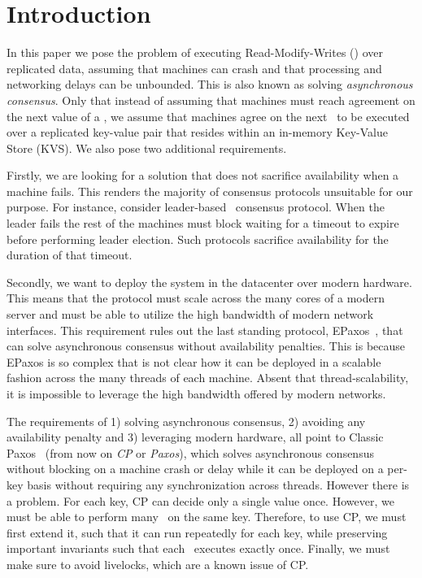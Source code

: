 \section{Introduction}

In this paper we pose the problem of executing Read-Modify-Writes (\RMWs) over replicated data, assuming that machines can crash and that processing and networking delays can be unbounded.
This is also known as solving \emph{asynchronous consensus}.
Only that instead of assuming that machines must reach agreement on the next value of a , we assume that machines agree on the next \RMW\ to be executed over a replicated key-value pair that resides within an in-memory Key-Value Store (KVS).
We also pose two additional requirements.

Firstly, we are looking for a solution that does not sacrifice availability when a machine fails. This renders the majority of consensus protocols unsuitable for our purpose. For instance, consider leader-based~\cite{Lamport:2001, Ongaro:2014, Reed:2008} consensus protocol. When the leader fails the rest of the machines must block waiting for a timeout to expire before performing leader election. Such protocols sacrifice availability for the duration of that timeout.

Secondly, we want to deploy the system in the datacenter over modern hardware. This means that the protocol must scale across the many cores of a modern server and must be able to utilize the high bandwidth of modern network interfaces. This requirement rules out the last standing protocol, EPaxos~\cite{Moraru:2013}, that can solve asynchronous consensus without availability penalties. This is because EPaxos is so complex that is not clear how it can be deployed in a scalable fashion across the many threads of each machine. Absent that thread-scalability, it is impossible to leverage the high bandwidth offered by modern networks.


\custvspace
The requirements of 1) solving asynchronous consensus, 2) avoiding any availability penalty and 3) leveraging modern hardware,  all point to 
Classic Paxos~\cite{Lamport:1998} (from now on \emph{CP} or \emph{Paxos}), which solves asynchronous consensus without blocking on a machine crash or delay while it can be deployed on a per-key basis without requiring any synchronization across threads. However there is a problem.
For each key, CP can decide only a single value once. 
However, we must be able to perform many \RMWs\ on the same key.
Therefore, to use CP, we must first extend it, such that it can run repeatedly for each key, while preserving important invariants such that each \RMW\ executes exactly once. Finally, we must make sure to avoid livelocks, which are a known issue of CP.


